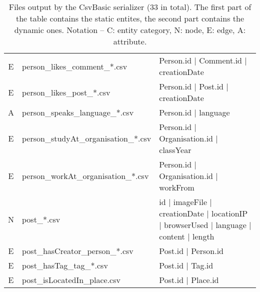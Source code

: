 \begin{table}[htb]
\begin{tabular}{|c|l|l|}
        E                       & person\_likes\_comment\_*.csv           & Person.id | Comment.id | creationDate                                                   \\
        E                       & person\_likes\_post\_*.csv              & Person.id | Post.id | creationDate                                                      \\
        A                       & person\_speaks\_language\_*.csv         & Person.id | language                                                                    \\
        E                       & person\_studyAt\_organisation\_*.csv    & Person.id | Organisation.id | classYear                                                 \\
        E                       & person\_workAt\_organisation\_*.csv     & Person.id | Organisation.id | workFrom                                                  \\
        \hline
        N                       & post\_*.csv                             & id | imageFile | creationDate | locationIP | browserUsed | language | content | length  \\
        E                       & post\_hasCreator\_person\_*.csv         & Post.id | Person.id                                                                     \\
        E                       & post\_hasTag\_tag\_*.csv                & Post.id | Tag.id                                                                        \\
        E                       & post\_isLocatedIn\_place.csv            & Post.id | Place.id                                                                      \\
        \hline
    \end{tabular}
    \caption{Files output by the CsvBasic serializer (33 in total). The first part of the table contains the static entites, the second part contains the dynamic ones. Notation -- C: entity category, N: node, E: edge, A: attribute.}
    \label{table:csv_basic}
\end{table}
